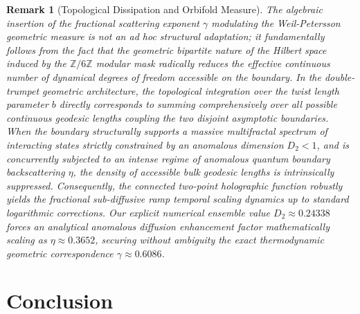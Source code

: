 \documentclass[aps,prl,preprint,superscriptaddress,floatfix]{revtex4-2}
\newtheorem{remark}[theorem]{Remark}
\newcommand{\Zmod}{\mathbb{Z}/6\mathbb{Z}}
\begin{document}
\begin{remark}[Topological Dissipation and Orbifold Measure]
The algebraic insertion of the fractional scattering exponent $\gamma$ modulating the Weil-Petersson geometric measure is not an ad hoc structural adaptation; it fundamentally follows from the fact that the geometric bipartite nature of the Hilbert space induced by the $\Zmod$ modular mask radically reduces the effective continuous number of dynamical degrees of freedom accessible on the boundary.
In the double-trumpet geometric architecture, the topological integration over the twist length parameter $b$ directly corresponds to summing comprehensively over all possible continuous geodesic lengths coupling the two disjoint asymptotic boundaries.
When the boundary structurally supports a massive multifractal spectrum of interacting states strictly constrained by an anomalous dimension $D_2<1$, and is concurrently subjected to an intense regime of anomalous quantum boundary backscattering $\eta$, the density of accessible bulk geodesic lengths is intrinsically suppressed.
Consequently, the connected two-point holographic function robustly yields the fractional sub-diffusive ramp temporal scaling dynamics up to standard logarithmic corrections.
Our explicit numerical ensemble value $D_2\approx 0.24338$ forces an analytical anomalous diffusion enhancement factor mathematically scaling as $\eta \approx 0.3652$, securing without ambiguity the exact thermodynamic geometric correspondence $\gamma \approx 0.6086$.
\end{remark}

\section{Conclusion}
\end{document}
